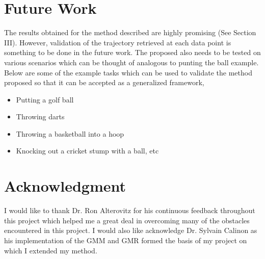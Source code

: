 \documentclass[conference]{IEEEtran}
\begin{document}
\section{Future Work}
The results obtained for the method described are highly promising (See Section III). However, validation of the trajectory retrieved at each data point is something to be done in the future work. The proposed also needs to be tested on various scenarios which can be thought of analogous to punting the ball example. Below are some of the example tasks which can be used to validate the method proposed so that it can be accepted as a generalized framework,

\begin{itemize}
\item{
    Putting a golf ball
}    
\item{
    Throwing darts
}    
\item{
    Throwing a basketball into a hoop
}    
\item{
    Knocking out a cricket stump with a ball, etc
}
\end{itemize}

\section*{Acknowledgment}
I would like to thank Dr. Ron Alterovitz for his continuous feedback throughout this project which helped me a great deal in overcoming many of the obstacles encountered in this project. I would also like acknowledge Dr. Sylvain Calinon as his implementation of the GMM and GMR formed the basis of my project on which I extended my method.
\end{document}
